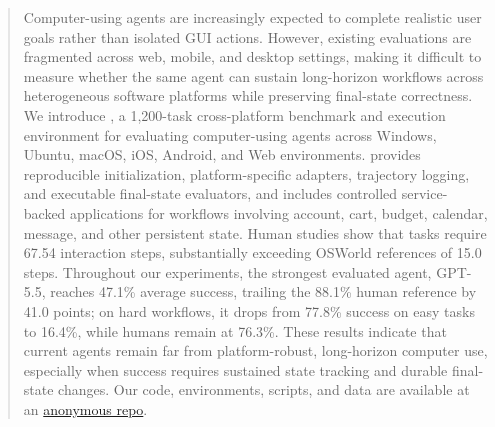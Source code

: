 \begin{abstract}
Computer-using agents are increasingly expected to complete realistic user goals rather than isolated GUI actions. However, existing evaluations are fragmented across web, mobile, and desktop settings, making it difficult to measure whether the same agent can sustain long-horizon workflows across heterogeneous software platforms while preserving final-state correctness. 
We introduce \dataset, a 1,200-task cross-platform benchmark and execution environment for evaluating computer-using agents across Windows, Ubuntu, macOS, iOS, Android, and Web environments. \dataset provides reproducible initialization, platform-specific adapters, trajectory logging, and executable final-state evaluators, and includes controlled service-backed applications for workflows involving account, cart, budget, calendar, message, and other persistent state. 
Human studies show that \dataset tasks require 67.54 interaction steps, substantially exceeding OSWorld references of 15.0 steps. Throughout our experiments, the strongest evaluated agent, GPT-5.5, reaches 47.1\% average success, trailing the 88.1\% human reference by 41.0 points; on hard workflows, it drops from 77.8\% success on easy tasks to 16.4\%, while humans remain at 76.3\%. These results indicate that current agents remain far from platform-robust, long-horizon computer use, especially when success requires sustained state tracking and durable final-state changes. Our code, environments, scripts, and data are available at an
\textcolor{blue}{\href{https://anonymous.4open.science/r/NeurIPS_2026_OS_Omni-5D21/README.md}{anonymous repo}}.
\end{abstract}
